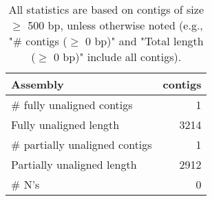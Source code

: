 \documentclass[12pt,a4paper]{article}
\begin{document}
\begin{table}[ht]
\begin{center}
\caption{All statistics are based on contigs of size $\geq$ 500 bp, unless otherwise noted (e.g., "\# contigs ($\geq$ 0 bp)" and "Total length ($\geq$ 0 bp)" include all contigs).}
\begin{tabular}{|l*{1}{|r}|}
\hline
Assembly & contigs \\ \hline
\# fully unaligned contigs & 1 \\ \hline
Fully unaligned length & 3214 \\ \hline
\# partially unaligned contigs & 1 \\ \hline
Partially unaligned length & 2912 \\ \hline
\# N's & 0 \\ \hline
\end{tabular}
\end{center}
\end{table}
\end{document}
